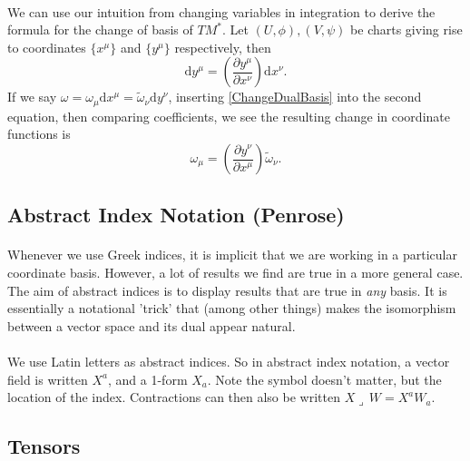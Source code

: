 \documentclass[11pt,fleqn]{report}
\newcommand{\contract}{\boldsymbol{\lrcorner}\, }
\begin{document}
\paragraph{} We can use our intuition from changing variables in integration to derive the formula for the change of basis of $TM^*$. Let $(U,\phi),(V,\psi)$ be charts giving rise to coordinates $\{x^\mu\}$ and $\{y^\mu\}$ respectively, then \begin{equation}\label{ChangeDualBasis}
\mathrm{d}y^\mu = \left(\frac{\partial y^\mu}{\partial x^\nu}\right) \mathrm{d}x^\nu.
\end{equation}
If we say $\omega = \omega_\mu \mathrm{d}x^\mu = \widetilde{\omega}_\nu \mathrm{d}y^\nu$, inserting \eqref{ChangeDualBasis} into the second equation, then comparing coefficients, we see the resulting change in coordinate functions is \begin{equation}
\omega_\mu = \left(\frac{\partial y^\nu}{\partial x^\mu}\right) \widetilde{\omega}_\nu.
\end{equation}

\subsection{Abstract Index Notation (Penrose)}
\paragraph{}Whenever we use Greek indices, it is implicit that we are working in a particular coordinate basis. However, a lot of results we find are true in a more general case. The aim of abstract indices is to display results that are true in \textit{any} basis. It is essentially a notational 'trick' that (among other things) makes the isomorphism between a vector space and its dual appear natural.

\paragraph{} We use Latin letters as abstract indices. So in abstract index notation, a vector field is written $X^a$, and a 1-form $X_a$. Note the symbol doesn't matter, but the location of the index. Contractions can then also be written $X\contract W = X^a W_a$.

\subsection{Tensors}
\end{document}
